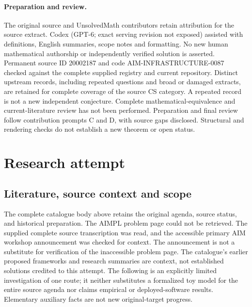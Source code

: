 \documentclass[11pt]{article}
\begin{document}
\paragraph{Preparation and review.}
The original source and UnsolvedMath contributors retain attribution for the source extract. Codex (GPT-6; exact serving revision not exposed) assisted with definitions, English summaries, scope notes and formatting. No new human mathematical authorship or independently verified solution is asserted. Permanent source ID 20002187 and code AIM-INFRASTRUCTURE-0087 checked against the complete supplied registry and current repository. Distinct upstream records, including repeated questions and broad or damaged extracts, are retained for complete coverage of the source CS category. A repeated record is not a new independent conjecture. Complete mathematical-equivalence and current-literature review has not been performed. Preparation and final review follow contribution prompts C and D, with source gaps disclosed. Structural and rendering checks do not establish a new theorem or open status.
\label{end:20002187}

\section{Research attempt}
\subsection{Literature, source context and scope}
The complete catalogue body above retains the original agenda, source status, and historical preparation. The AIMPL problem page could not be retrieved. The supplied complete source transcription was read, and the accessible primary AIM workshop announcement was checked for context. The announcement is not a substitute for verification of the inaccessible problem page. The catalogue's earlier proposed frameworks and research summaries are context, not established solutions credited to this attempt. The following is an explicitly limited investigation of one route; it neither substitutes a formalized toy model for the entire source agenda nor claims empirical or deployed-software results. Elementary auxiliary facts are not new original-target progress.
\end{document}
